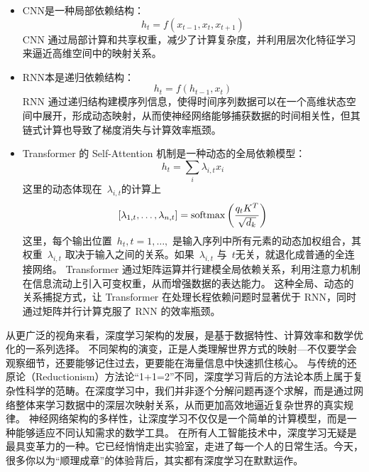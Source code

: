 \begin{itemize}
\item  CNN是一种局部依赖结构：
$$
h_t = f\left ( x_{t-1},  x_t, x_{t+1} \right)
$$
CNN 通过局部计算和共享权重，减少了计算复杂度，并利用层次化特征学习来逼近高维空间中的映射关系。
\item RNN本是递归依赖结构：
$$
h_t = f\left ( h_{t-1} , x_t \right)
$$
RNN 通过递归结构建模序列信息，使得时间序列数据可以在一个高维状态空间中展开，形成动态映射，从而使神经网络能够捕获数据的时间相关性，但其链式计算也导致了梯度消失与计算效率瓶颈。
\item  Transformer 的 Self-Attention 机制是一种动态的全局依赖模型：
$$
h_t = \sum_{i} \lambda_{i,t} x_i
$$
这里的动态体现在~$\lambda_{i,t}$的计算上
$$
[\lambda_{1,t},\dots, \lambda_{n,t}  ]
 ={\rm softmax} \left( \frac{q_t K^T}{\sqrt{d_k}}\right)
 $$
这里，每个输出位置~$h_t,t=1,\dots,$ 是输入序列中所有元素的动态加权组合，其权重~$\lambda_{i,t}$ 取决于输入之间的关系。如果~$\lambda_{i,t}$ 与~$t$无关，就退化成普通的全连接网络。
Transformer 通过矩阵运算并行建模全局依赖关系，利用注意力机制在信息流动上引入可变权重，从而增强数据的表达能力。
这种全局、动态的关系捕捉方式，让 Transformer 在处理长程依赖问题时显著优于 RNN，同时通过矩阵并行计算克服了 RNN 的效率瓶颈。
\end{itemize}
从更广泛的视角来看，深度学习架构的发展，是基于数据特性、计算效率和数学优化的一系列选择。
不同架构的演变，正是人类理解世界方式的映射---不仅要学会观察细节，还要能够记住过去，更要能在海量信息中快速抓住核心。
与传统的还原论（Reductionism）方法论“1+1=2”不同，深度学习背后的方法论本质上属于复杂性科学的范畴。在深度学习中，我们并非逐个分解问题再逐个求解，而是通过网络整体来学习数据中的深层次映射关系，从而更加高效地逼近复杂世界的真实规律。
神经网络架构的多样性，让深度学习不仅仅是一个简单的计算模型，而是一种能够适应不同认知需求的数学工具。
在所有人工智能技术中，深度学习无疑是最具变革力的一种。它已经悄悄走出实验室，走进了每一个人的日常生活。今天，很多你以为“顺理成章”的体验背后，其实都有深度学习在默默运作。

